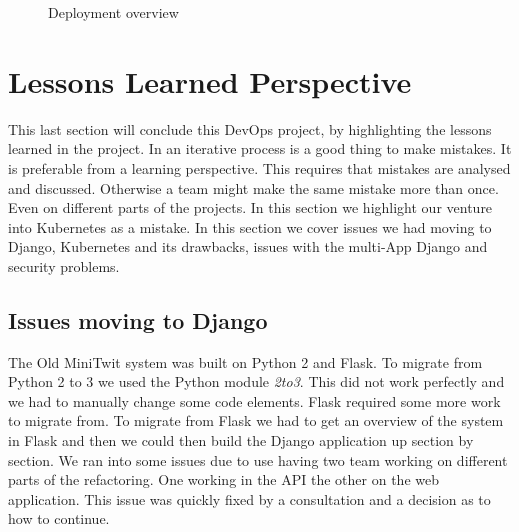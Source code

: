 \documentclass[12pt]{article}
\begin{document}
\begin{figure}[]
    \centering
    \caption{Deployment overview}
    \label{fig:deployment_overview}
\end{figure}

    
\section{Lessons Learned Perspective}
This last section will conclude this DevOps project, by highlighting the lessons learned in the project. In an iterative process is a good thing to make mistakes. It is preferable from a learning perspective. This requires that mistakes are analysed and discussed. Otherwise a team might make the same mistake more than once. Even on different parts of the projects. In this section we highlight our venture into Kubernetes as a mistake. In this section we cover issues we had moving to Django, Kubernetes and its drawbacks, issues with the multi-App Django and security problems.
\subsection{Issues moving to Django}
The Old MiniTwit system was built on Python 2 and Flask. To migrate from Python 2 to 3 we used the Python module \textit{2to3}. This did not work perfectly and we had to manually change some code elements. Flask required some more work to migrate from. To migrate from Flask we had to get an overview of the system in Flask and then we could then build the Django application up section by section. We ran into some issues due to use having two team working on different parts of the refactoring. One working in the API the other on the web application. This issue was quickly fixed by a consultation and a decision as to how to continue.
\end{document}

